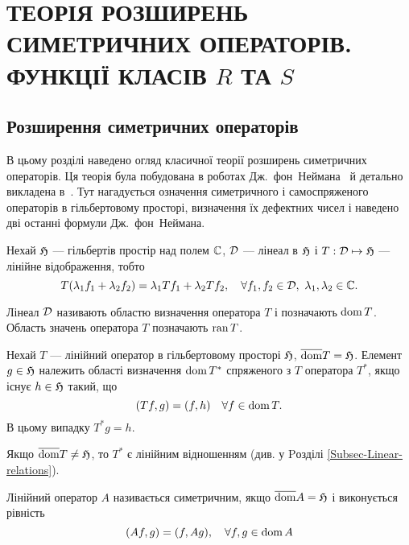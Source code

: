 
\section{ТЕОРІЯ РОЗШИРЕНЬ СИМЕТРИЧНИХ ОПЕРАТОРІВ. ФУНКЦІЇ КЛАСІВ $R$ ТА $S$} %

\subsection{Розширення симетричних операторів} %

В цьому розділі наведено огляд класичної теорії розширень симетричних операторів. Ця теорія була побудована в роботах Дж.~фон~Неймана~\cite{Neumann1930,Neumann1933} й детально викладена в~\cite{AkhGlaz78}. Тут нагадується означення симетричного і самоспряженого операторів в гільбертовому просторі, визначення їх дефектних чисел і наведено дві останні формули Дж.~фон~Неймана.

Нехай $\mathfrak{H}$ --- гільбертів простір над полем $\mathbb{C}$, $\mathcal{D}$ --- лінеал в $\mathfrak{H}$ і $T:\mathcal{D}\mapsto \mathfrak{H}$ --- лінійне відображення, тобто
\begin{equation*}
	T(\lambda_1f_1+\lambda_2f_2) = \lambda_1Tf_1+\lambda_2Tf_2, \quad \forall f_1,f_2\in \calD,\ \lambda_1,\lambda_2\in\bbC.
\end{equation*}

Лінеал $\mathcal{D}$ називають областю визначення оператора $T$ і позначають $\operatorname{dom}{T}$. Область значень оператора $T$ позначають $\operatorname{ran}{T}$.

\begin{definition} \label{def_adjoint operator}
	Нехай $T$ --- лінійний оператор в гільбертовому просторі $\mathfrak{H}$, $\overline{\operatorname{dom}}{T}=\mathfrak{H}$. Елемент $g\in\mathfrak{H}$ належить області визначення $\operatorname{dom}{T^*}$ спряженого з $T$ оператора $T^*$, якщо існує $h\in\mathfrak{H}$ такий, що
	\begin{equation}\label{eq-adj-oper}
		(Tf,g) = (f,h) \quad \forall f\in\operatorname{dom}{T}.
	\end{equation}
	В цьому випадку $T^*g=h$.
\end{definition}

\begin{remark*}
	Якщо $\overline{\operatorname{dom}}{T}\ne\mathfrak{H}$, то $T^*$ є лінійним відношенням (див. у Pозділі \ref{Subsec-Linear-relations}).
\end{remark*}

\begin{definition} \label{def_Symmetr_operator}
	Лінійний оператор $A$ називається симетричним, якщо  $\overline{\operatorname{dom}}{A}=\mathfrak{H}$ і виконується рівність
	\begin{equation*}
		(Af,g) = (f,Ag), \quad \forall f,g\in \operatorname{dom}{A}
	\end{equation*}
\end{definition}

